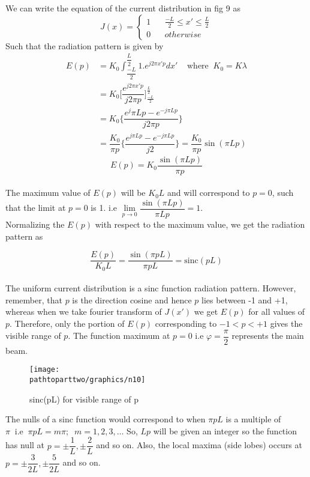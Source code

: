 We can write the equation of the current distribution in fig 9 as
\begin{equation*}
J(x) =
\begin{cases}
1 \ \ \ \ & \frac{-L}{2}\le x' \le \frac{L}{2} \\
0  & otherwise
\end{cases}
\end{equation*}
Such that the radiation pattern is given by 
\begin{align*}
E(p) &= K_0\int_{\dfrac{-L}{2}}^{\dfrac{L}{2}} 1.e^{j2\pi x'p }dx' \; \; \; \;\text{where}\; \;  K_0 = K\lambda\\ %
&= K_0\bigg[\dfrac{e^{j2\pi x'p}}{j2\pi p}\bigg]_{\frac{-L}{2}}^{ \frac{L}{2}}\\	  
&= K_0 \bigg\{\dfrac{ e{^j\pi Lp}- e^{-j\pi Lp}}{j2\pi p}\bigg\}\\
& = \dfrac{K_0}{\pi p}\bigg\{\dfrac{ e^{j\pi Lp} -  e^{-j\pi Lp}}{j2}\bigg\} = \dfrac{K_0}{\pi p}\sin(\pi Lp)
\end{align*}
$$E(p) = K_0 \dfrac{\sin (\pi Lp)}{\pi p}$$\\
The maximum value of $E(p)$ will be $K_0L$ and will correspond to $ p = 0$, such that the limit at $p = 0$ is 1. i.e $\lim\limits_{p\rightarrow0} \dfrac{\sin(\pi Lp)}{\pi Lp} = 1$.\\
Normalizing the $E(p)$ with respect to the maximum value, we get the radiation pattern as

\begin{equation}
\dfrac{E(p)}{K_0 L} = \dfrac{\sin(\pi pL)}{\pi pL} = \text{sinc}(pL)
\end{equation}
\\
The uniform current distribution is a sinc function radiation pattern. However, remember, that $p$ is the direction cosine and hence $p$ lies between -1 and +1, whereas when we take fourier transform of $J(x')$ we get $E(p)$ for all values of $p$. Therefore, only the portion of $E(p)$ corresponding to $-1 < p < +1$ gives the visible range of $p$. The function maximum at $p = 0$ i.e $\varphi = \dfrac{\pi}{2}$ represents the main beam.

\begin{figure}[h]
\centering
\texttt{[image: \\pathtoparttwo/graphics/n10]}
\caption{sinc(pL) for visible range of p}
\label{fig10}
\end{figure}

The nulls of a sinc function would correspond to when $\pi pL$ is a multiple of $\pi \; \; \text{i.e} \; \; \pi pL = m\pi ; \; \; m = 1, 2, 3, \ldots$ So, $Lp$ will be given an integer so the function has null at $p = \pm\dfrac{1}{L}, \pm\dfrac{2}{L}$ and so on. Also, the local maxima (side lobes) occurs at $p = \pm\dfrac{3}{2L}, \pm\dfrac{5}{2L}$ and so on.


